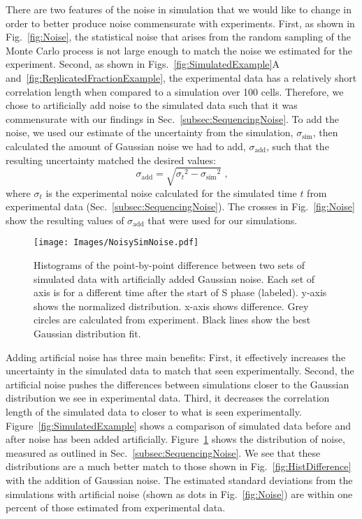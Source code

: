 		There are two features of the noise in simulation that we would like to change in order to better produce noise commensurate with experiments.
		First, as shown in Fig.~\ref{fig:Noise}, the statistical noise that arises from the random sampling of the Monte Carlo process is not large enough to match the noise we estimated for the experiment.
		Second, as shown in Figs.~\ref{fig:SimulatedExample}A and~\ref{fig:ReplicatedFractionExample}, the experimental data has a relatively short correlation length when compared to a simulation over 100 cells.
		Therefore, we chose to artificially add noise to the simulated data such that it was commensurate with our findings in Sec.~\ref{subsec:SequencingNoise}.
		To add the noise, we used our estimate of the uncertainty from the simulation, $\sigma_\text{sim}$, then calculated the amount of Gaussian noise we had to add, $\sigma_\text{add}$, such that the resulting uncertainty matched the desired values:
		\begin{equation} \label{eq:AddingNoise}
			\sigma_\text{add} = \sqrt{{\sigma_t}^2 - {\sigma_\text{sim}}^2} \text{ ,}
		\end{equation}
		where $\sigma_t$ is the experimental noise calculated for the simulated time $t$ from experimental data (Sec.~\ref{subsec:SequencingNoise}).
		The crosses in Fig.~\ref{fig:Noise} show the resulting values of $\sigma_\text{add}$ that were used for our simulations.
		
		\begin{figure}[tbh]
			\begin{center}
				\texttt{[image: Images/NoisySimNoise.pdf]}
			\end{center}
				\caption[Estimating Simulation Noise]{\label{fig:NoisySimNoise} Histograms of the point-by-point difference between two sets of simulated data with artificially added Gaussian noise.
					Each set of axis is for a different time after the start of S phase (labeled).
					y-axis shows the normalized distribution.
					x-axis shows difference.
					Grey circles are calculated from experiment.
					Black lines show the best Gaussian distribution fit.
				}
		\end{figure}
		
		Adding artificial noise has three main benefits:
		First, it effectively increases the uncertainty in the simulated data to match that seen experimentally.
		Second, the artificial noise pushes the differences between simulations closer to the Gaussian distribution we see in experimental data.
		Third, it decreases the correlation length of the simulated data to closer to what is seen experimentally.
		Figure~\ref{fig:SimulatedExample} shows a comparison of simulated data before and after noise has been added artificially.
		Figure~\ref{fig:NoisySimNoise} shows the distribution of noise, measured as outlined in Sec.~\ref{subsec:SequencingNoise}.
		We see that these distributions are a much better match to those shown in Fig.~\ref{fig:HistDifference} with the addition of Gaussian noise.
		The estimated standard deviations from the simulations with artificial noise (shown as dots in Fig.~\ref{fig:Noise}) are within one percent of those estimated from experimental data.

